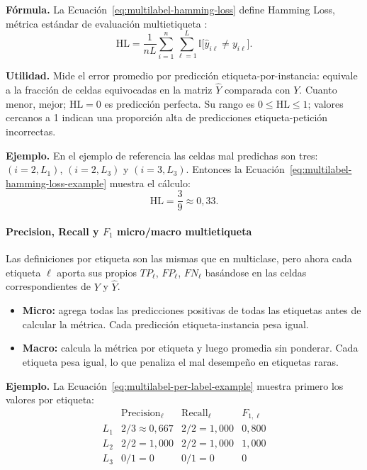 \documentclass[12pt,oneside]{report}
\newcommand{\ind}{\mathbb{I}} %
\begin{document}
\textbf{Fórmula.} La Ecuación~\eqref{eq:multilabel-hamming-loss} define Hamming Loss, métrica estándar de evaluación multietiqueta \cite{tsoumakas_multilabel_overview,read2011}:
\begin{equation}
\label{eq:multilabel-hamming-loss}
\mathrm{HL}=\frac{1}{nL}\sum_{i=1}^n\sum_{\ell=1}^L \ind\big[\hat{y}_{i\ell}\ne y_{i\ell}\big].
\end{equation}

\textbf{Utilidad.} Mide el error promedio por predicción
etiqueta-por-instancia: equivale a la fracción de celdas equivocadas en
la matriz $\hat{Y}$ comparada con $Y$. Cuanto menor, mejor;
$\mathrm{HL}=0$ es predicción perfecta. Su rango es $0 \leq \mathrm{HL} \leq 1$; valores cercanos a 1 indican una proporción alta de predicciones etiqueta-petición incorrectas.

\textbf{Ejemplo.} En el ejemplo de referencia las celdas mal predichas
son tres: $(i{=}2,L_1)$, $(i{=}2,L_3)$ y $(i{=}3,L_3)$. Entonces la Ecuación~\eqref{eq:multilabel-hamming-loss-example} muestra el cálculo:
\begin{equation}
\label{eq:multilabel-hamming-loss-example}
\mathrm{HL}=\frac{3}{9}\approx 0{,}33.
\end{equation}

\paragraph{Precision, Recall y $F_1$ micro/macro multietiqueta}

Las definiciones por etiqueta son las mismas que en multiclase, pero
ahora cada etiqueta $\ell$ aporta sus propios $TP_\ell$, $FP_\ell$,
$FN_\ell$ basándose en las celdas correspondientes de $Y$ y $\hat Y$.
\begin{itemize}[leftmargin=*]
  \item \textbf{Micro:} agrega todas las predicciones positivas de todas
  las etiquetas antes de calcular la métrica. Cada predicción
  etiqueta-instancia pesa igual.
  \item \textbf{Macro:} calcula la métrica por etiqueta y luego promedia
  sin ponderar. Cada etiqueta pesa igual, lo que penaliza el mal
  desempeño en etiquetas raras.
\end{itemize}

\textbf{Ejemplo.} La Ecuación~\eqref{eq:multilabel-per-label-example} muestra primero los valores por etiqueta:
\begin{equation}
\label{eq:multilabel-per-label-example}
\begin{array}{l|ccc}
 & \mathrm{Precision}_\ell & \mathrm{Recall}_\ell & F_{1,\ell} \\
\hline
L_1 & 2/3\approx 0{,}667 & 2/2 = 1{,}000 & 0{,}800 \\
L_2 & 2/2 = 1{,}000      & 2/2 = 1{,}000 & 1{,}000 \\
L_3 & 0/1 = 0            & 0/1 = 0       & 0
\end{array}
\end{equation}
\end{document}
